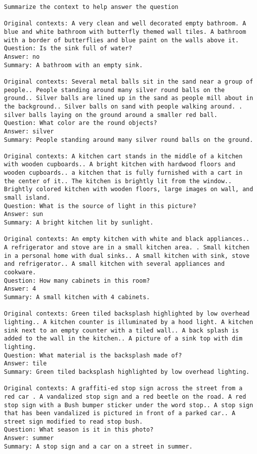 \documentclass[10pt,twocolumn,letterpaper]{article}
\begin{document}
\begin{tiny}
\begin{lstlisting}[breaklines]
Summarize the context to help answer the question

Original contexts: A very clean and well decorated empty bathroom. A blue and white bathroom with butterfly themed wall tiles. A bathroom with a border of butterflies and blue paint on the walls above it.
Question: Is the sink full of water?
Answer: no
Summary: A bathroom with an empty sink.

Original contexts: Several metal balls sit in the sand near a group of people.. People standing around many silver round balls on the ground.. Silver balls are lined up in the sand as people mill about in the background.. Silver balls on sand with people walking around. . silver balls laying on the ground around a smaller red ball.
Question: What color are the round objects?
Answer: silver
Summary: People standing around many silver round balls on the ground.

Original contexts: A kitchen cart stands in the middle of a kitchen with wooden cupboards.. A bright kitchen with hardwood floors and wooden cupboards.. a kitchen that is fully furnished with a cart in the center of it.. The kitchen is brightly lit from the window.. Brightly colored kitchen with wooden floors, large images on wall, and small island.
Question: What is the source of light in this picture?
Answer: sun
Summary: A bright kitchen lit by sunlight.

Original contexts: An empty kitchen with white and black appliances.. A refrigerator and stove are in a small kitchen area. . Small kitchen in a personal home with dual sinks.. A small kitchen with sink, stove and refrigerator.. A small kitchen with several appliances and cookware.
Question: How many cabinets in this room?
Answer: 4
Summary: A small kitchen with 4 cabinets.

Original contexts: Green tiled backsplash highlighted by low overhead lighting.. A kitchen counter is illuminated by a hood light. A kitchen sink next to an empty counter with a tiled wall.. A back splash is added to the wall in the kitchen.. A picture of a sink top with dim lighting.
Question: What material is the backsplash made of?
Answer: tile
Summary: Green tiled backsplash highlighted by low overhead lighting.

Original contexts: A graffiti-ed stop sign across the street from a red car . A vandalized stop sign and a red beetle on the road. A red stop sign with a Bush bumper sticker under the word stop.. A stop sign that has been vandalized is pictured in front of a parked car.. A street sign modified to read stop bush.
Question: What season is it in this photo?
Answer: summer
Summary: A stop sign and a car on a street in summer.


\end{lstlisting}
\end{tiny}
\end{document}

